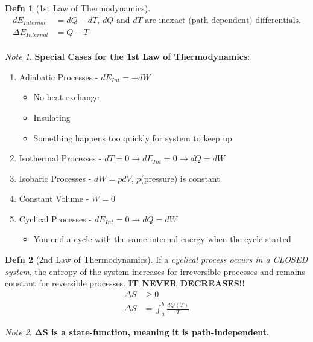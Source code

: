 \documentclass[10pt,letterpaper,final,twoside,notitlepage]{article}
\numberwithin{equation}{section} %
\theoremstyle{definition}
\newtheorem{definition}{Defn} %
\theoremstyle{remark}
\newtheorem{note}{Note}[definition] %
\begin{document}
		\begin{definition}[1st Law of Thermodynamics] \label{def:1st Law of Thermo}
			\begin{equation} \label{eq:1st Law of Thermo}
				\begin{aligned}
					dE_{Internal} &= dQ - dT \text{, } dQ \text{ and } dT \text{ are inexact	(path-dependent) differentials.} \\
					\Delta E_{Internal} &= Q-T \\
				\end{aligned}
			\end{equation}
			\begin{note} \label{note:1st Law of Thermo Special Cases}
				\textbf{Special Cases for the 1st Law of Thermodynamics}:
				\begin{enumerate}
					\item Adiabatic Processes - $dE_{Int} = -dW$
					\begin{itemize}[noitemsep, nolistsep]
						\item No heat exchange
						\item Insulating
						\item Something happens too quickly for system to keep up
					\end{itemize}
					\item Isothermal Processes - $dT = 0 \rightarrow dE_{Int} = 0 \rightarrow dQ = dW$
					\item Isobaric Processes - $dW = pdV$, $p$(pressure) is constant
					\item Constant Volume - $W = 0$
					\item Cyclical Processes - $dE_{Int} = 0 \rightarrow dQ = dW$
					\begin{itemize}[noitemsep, nolistsep]
						\item You end a cycle with the same internal energy when the cycle started
					\end{itemize}
				\end{enumerate}
			\end{note}
		\end{definition}
		\begin{definition}[2nd Law of Thermodynamics] \label{def:2nd Law of Thermo}
			If a \emph{cyclical process occurs in a CLOSED system}, the entropy of the system increases for irreversible processes and remains constant for reversible processes. \textbf{IT NEVER DECREASES!!}
			\begin{align} \label{eq:2nd Law of Thermo}
				\Delta S &\geq 0 \\
				\Delta S &= \int_{a}^{b} \frac{dQ \left( T \right)}{T} 
			\end{align}
			\begin{note}
				\textbf{$\mathbf{\Delta S}$ is a state-function, meaning it is path-independent.}
			\end{note}
		\end{definition}
	
\end{document}
